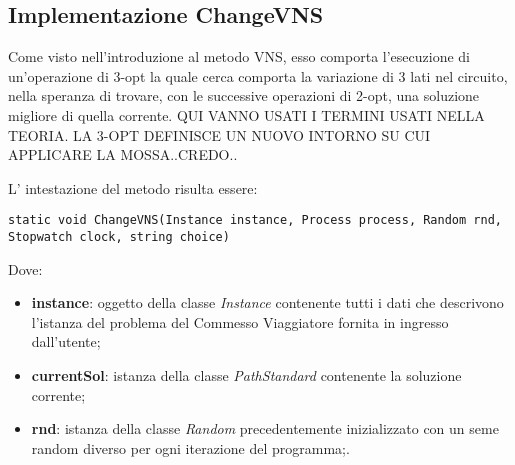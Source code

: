 \subsection{Implementazione ChangeVNS}
Come visto nell'introduzione al metodo VNS, esso comporta l'esecuzione di un'operazione di 3-opt la quale cerca comporta la variazione di 3 lati nel circuito, nella speranza di trovare, con le successive operazioni di 2-opt, una soluzione migliore di quella corrente. QUI VANNO USATI I TERMINI USATI NELLA TEORIA. LA 3-OPT DEFINISCE UN NUOVO INTORNO SU CUI APPLICARE LA MOSSA..CREDO..

L' intestazione del metodo risulta essere:

\begin{lstlisting}
static void ChangeVNS(Instance instance, Process process, Random rnd, Stopwatch clock, string choice)
\end{lstlisting}

Dove:

\begin{itemize}
    \item \textbf{instance}: oggetto della classe \textit{Instance} contenente tutti i dati che descrivono l'istanza del problema del Commesso Viaggiatore fornita in ingresso dall'utente;
    \item \textbf{currentSol}: istanza della classe \textit{PathStandard} contenente la soluzione corrente;
    \item \textbf{rnd}: istanza della classe \textit{Random} precedentemente inizializzato con un seme random diverso per ogni iterazione del programma;.
\end{itemize}

